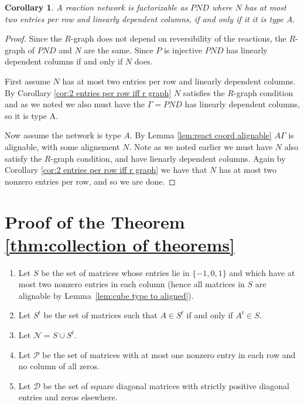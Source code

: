 \documentclass{article}
\newtheorem{cor}{Corollary}
\begin{document}
\begin{cor}
    A reaction network is factorizable as $PND$ where $N$ has at most two entries per row and linearly dependent columns, if and only if it it is type A.
\end{cor}

\begin{proof}
    Since the $R$-graph does not depend on reversibility of the reactions, the $R$-graph of $PND$ and $N$ are the same. Since $P$ is injective $PND$ has linearly dependent columns if and only if $N$ does.

    First assume $N$ has at most two entries per row and linearly dependent columns. By Corollary \ref{cor:2 entries per row iff r graph} $N$ satisfies the $R$-graph condition and as we noted we also must have the $\Gamma = PND$ has linearly dependent columns, so it is type A. 

    Now assume the network is type $A$. By Lemma \ref{lem:react coord alignable} $A
    \Gamma$ is alignable, with some alignement $N$. Note as we noted earlier we must have $N$ also satisfy the $R$-graph condition, and have lienarly dependent columns. Again by Corollary \ref{cor:2 entries per row iff r graph} we have that $N$ has at most two nonzero entries per row, and so we are done.
\end{proof}



\section{Proof of the Theorem \ref{thm:collection of theorems}}
\label{sec:proof of theorem 1}


\begin{enumerate}
    \item Let \( S \) be the set of matrices whose entries lie in \( \{-1, 0, 1\} \) and which have at most two nonzero entries in each column (hence all matrices in \( S \) are alignable by Lemma~\ref{lem:cube type to aligned}).
    \item Let \( S^t \) be the set of matrices such that \( A \in S^t \) if and only if \( A^t \in S \).
    \item Let \( \mathcal{N} = S \cup S^t \).
    \item Let \( \mathcal{P} \) be the set of matrices with at most one nonzero entry in each row and no column of all zeros.
    \item Let \( \mathcal{D} \) be the set of square diagonal matrices with strictly positive diagonal entries and zeros elsewhere.
\end{enumerate}
\end{document}
